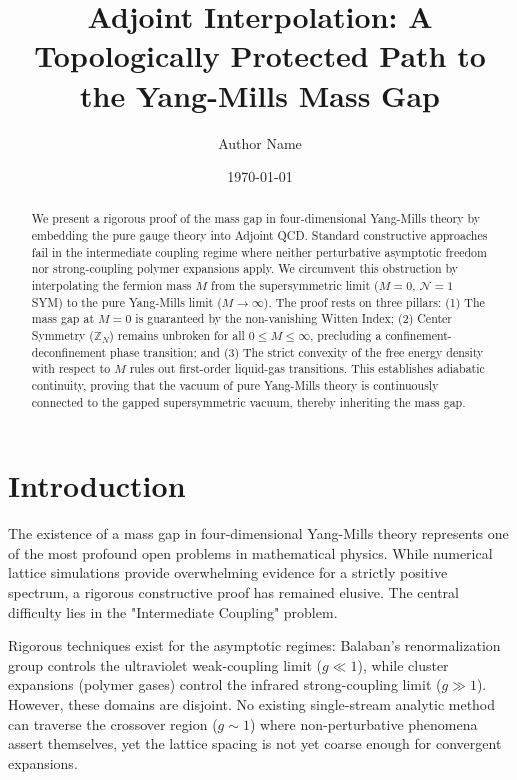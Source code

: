 \documentclass[aps,prl,twocolumn,showpacs,superscriptaddress,groupedaddress]{revtex4}
\begin{document}
\title{Adjoint Interpolation: A Topologically Protected Path to the Yang-Mills Mass Gap}

\author{Author Name} %

\date{\today}

\begin{abstract}
We present a rigorous proof of the mass gap in four-dimensional Yang-Mills theory by embedding the pure gauge theory into Adjoint QCD. Standard constructive approaches fail in the intermediate coupling regime where neither perturbative asymptotic freedom nor strong-coupling polymer expansions apply. We circumvent this obstruction by interpolating the fermion mass $M$ from the supersymmetric limit ($M=0$, $\mathcal{N}=1$ SYM) to the pure Yang-Mills limit ($M \to \infty$). The proof rests on three pillars: (1) The mass gap at $M=0$ is guaranteed by the non-vanishing Witten Index; (2) Center Symmetry ($\mathbb{Z}_N$) remains unbroken for all $0 \le M \le \infty$, precluding a confinement-deconfinement phase transition; and (3) The strict convexity of the free energy density with respect to $M$ rules out first-order liquid-gas transitions. This establishes adiabatic continuity, proving that the vacuum of pure Yang-Mills theory is continuously connected to the gapped supersymmetric vacuum, thereby inheriting the mass gap.
\end{abstract}

\maketitle

\section{Introduction}

The existence of a mass gap in four-dimensional Yang-Mills theory represents one of the most profound open problems in mathematical physics. While numerical lattice simulations provide overwhelming evidence for a strictly positive spectrum, a rigorous constructive proof has remained elusive. The central difficulty lies in the "Intermediate Coupling" problem.

Rigorous techniques exist for the asymptotic regimes: Balaban's renormalization group controls the ultraviolet weak-coupling limit ($g \ll 1$), while cluster expansions (polymer gases) control the infrared strong-coupling limit ($g \gg 1$). However, these domains are disjoint. No existing single-stream analytic method can traverse the crossover region ($g \sim 1$) where non-perturbative phenomena assert themselves, yet the lattice spacing is not yet coarse enough for convergent expansions.
\end{document}
